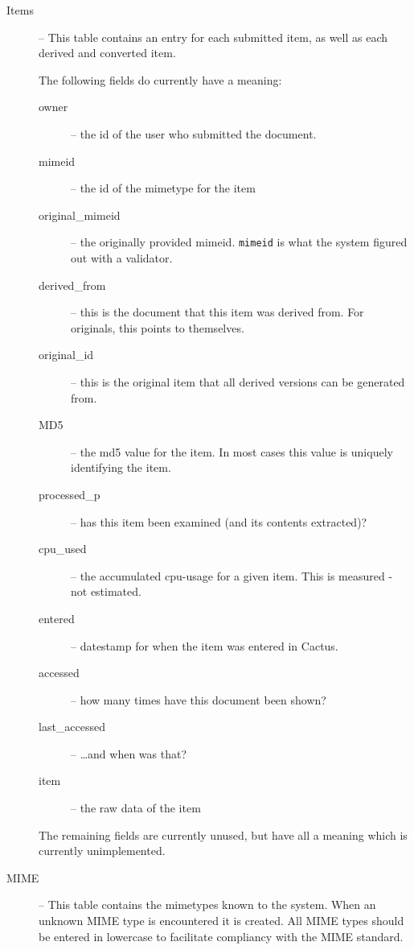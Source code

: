 \begin{description}


\item[Items] -- This table contains an entry for each submitted item,
  as well as each derived and converted item.

The following fields do currently have a meaning:

\begin{description}
\item[owner] -- the id of the user who submitted the document.
\item[mimeid] -- the id of the mimetype for the item

\item[original\_mimeid] -- the originally provided mimeid.
  \texttt{mimeid} is what the system figured out with a validator.

\item[derived\_from] -- this is the document that this item was derived
  from.  For originals, this points to themselves.
\item[original\_id] -- this is the original item that all derived
  versions can be generated from.
\item[MD5] -- the md5 value for the item.  In most cases this value is
  uniquely identifying the item.
\item[processed\_p] -- has this item been examined (and its contents
extracted)?

\item[cpu\_used] -- the accumulated cpu-usage for a given item.  This
  is measured - not estimated.


\item[entered] -- datestamp for when the item was entered in Cactus.


\item[accessed]  -- how many times have this document been shown?
\item[last\_accessed] -- \ldots and when was that?
\item[item] -- the raw data of the item
\end{description}

The remaining fields are currently unused, but have all a meaning
which is currently unimplemented.




\item[MIME] -- This table contains the mimetypes known to the system.
  When an unknown MIME type is encountered it is created.  All MIME
  types should be entered in lowercase to facilitate compliancy with
  the MIME standard.


\end{description}
